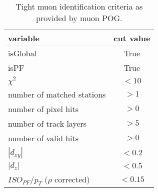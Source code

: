 \begin{table}[ht]
    \centering
    \setlength{\tabcolsep}{2em}
    \renewcommand{\arraystretch}{1.1}
    \caption{Tight muon identification criteria as provided by muon POG. }
    \label{tab:muon_id}
    \begin{tabular}{l|c}
    \hline
    variable                            & cut value \\
    \hline
    isGlobal                            & True      \\
    isPF                                & True      \\
    $\chi^{2}$                          & $< 10$    \\
    number of matched stations          & $> 1$     \\
    number of pixel hits                & $> 0$     \\
    number of track layers              & $> 5$     \\
    number of valid hits                & $> 0$     \\
    $|d_{xy}|$                          & $< 0.2$   \\
    $|d_{z}|$                           & $< 0.5$    \\
    \hline
    $ISO_{PF}/p_{T}$ ($\rho$ corrected) & $< 0.15$ \\
    \hline
    \end{tabular}
\end{table}
